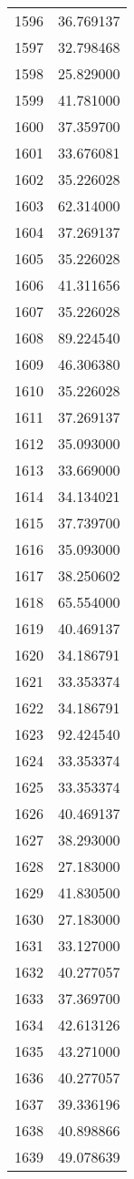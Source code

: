 \documentclass[12pt]{article}
\begin{document}
\begin{longtable}{@{}cc@{}}
1596 & 36.769137 \\
1597 & 32.798468 \\
1598 & 25.829000 \\
1599 & 41.781000 \\
1600 & 37.359700 \\
1601 & 33.676081 \\
1602 & 35.226028 \\
1603 & 62.314000 \\
1604 & 37.269137 \\
1605 & 35.226028 \\
1606 & 41.311656 \\
1607 & 35.226028 \\
1608 & 89.224540 \\
1609 & 46.306380 \\
1610 & 35.226028 \\
1611 & 37.269137 \\
1612 & 35.093000 \\
1613 & 33.669000 \\
1614 & 34.134021 \\
1615 & 37.739700 \\
1616 & 35.093000 \\
1617 & 38.250602 \\
1618 & 65.554000 \\
1619 & 40.469137 \\
1620 & 34.186791 \\
1621 & 33.353374 \\
1622 & 34.186791 \\
1623 & 92.424540 \\
1624 & 33.353374 \\
1625 & 33.353374 \\
1626 & 40.469137 \\
1627 & 38.293000 \\
1628 & 27.183000 \\
1629 & 41.830500 \\
1630 & 27.183000 \\
1631 & 33.127000 \\
1632 & 40.277057 \\
1633 & 37.369700 \\
1634 & 42.613126 \\
1635 & 43.271000 \\
1636 & 40.277057 \\
1637 & 39.336196 \\
1638 & 40.898866 \\
1639 & 49.078639 \\

\end{longtable}
\end{document}
